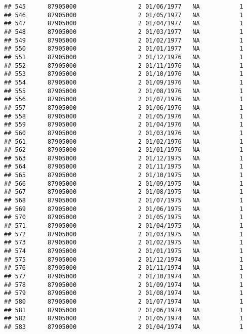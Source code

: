 \documentclass[
]{article}
\begin{document}
\begin{verbatim}
## 545      87905000                 2 01/06/1977   NA           1
## 546      87905000                 2 01/05/1977   NA           1
## 547      87905000                 2 01/04/1977   NA           1
## 548      87905000                 2 01/03/1977   NA           1
## 549      87905000                 2 01/02/1977   NA           1
## 550      87905000                 2 01/01/1977   NA           1
## 551      87905000                 2 01/12/1976   NA           1
## 552      87905000                 2 01/11/1976   NA           1
## 553      87905000                 2 01/10/1976   NA           1
## 554      87905000                 2 01/09/1976   NA           1
## 555      87905000                 2 01/08/1976   NA           1
## 556      87905000                 2 01/07/1976   NA           1
## 557      87905000                 2 01/06/1976   NA           1
## 558      87905000                 2 01/05/1976   NA           1
## 559      87905000                 2 01/04/1976   NA           1
## 560      87905000                 2 01/03/1976   NA           1
## 561      87905000                 2 01/02/1976   NA           1
## 562      87905000                 2 01/01/1976   NA           1
## 563      87905000                 2 01/12/1975   NA           1
## 564      87905000                 2 01/11/1975   NA           1
## 565      87905000                 2 01/10/1975   NA           1
## 566      87905000                 2 01/09/1975   NA           1
## 567      87905000                 2 01/08/1975   NA           1
## 568      87905000                 2 01/07/1975   NA           1
## 569      87905000                 2 01/06/1975   NA           1
## 570      87905000                 2 01/05/1975   NA           1
## 571      87905000                 2 01/04/1975   NA           1
## 572      87905000                 2 01/03/1975   NA           1
## 573      87905000                 2 01/02/1975   NA           1
## 574      87905000                 2 01/01/1975   NA           1
## 575      87905000                 2 01/12/1974   NA           1
## 576      87905000                 2 01/11/1974   NA           1
## 577      87905000                 2 01/10/1974   NA           1
## 578      87905000                 2 01/09/1974   NA           1
## 579      87905000                 2 01/08/1974   NA           1
## 580      87905000                 2 01/07/1974   NA           1
## 581      87905000                 2 01/06/1974   NA           1
## 582      87905000                 2 01/05/1974   NA           1
## 583      87905000                 2 01/04/1974   NA           1

\end{verbatim}
\end{document}

